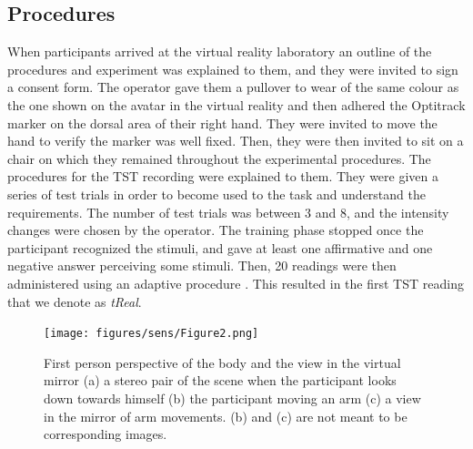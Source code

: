 \documentclass[
		twoside,openright,titlepage,numbers=noenddot,manychapters,
		headinclude,%
                footinclude=false,cleardoublepage=empty,
                BCOR=5mm,
		fontsize=11pt, %
                 enabledeprecatedfontcommands]{scrreprt}
\begin{document}
\subsection{Procedures}
When participants arrived at the virtual reality laboratory an outline of the procedures and experiment was explained to them, and they were invited to sign a consent form. The operator gave them a pullover to wear of the same colour as the one shown on the avatar in the virtual reality and then adhered the Optitrack marker on the dorsal area of their right hand. They were invited to move the hand to verify the marker was well fixed. Then, they were then invited to sit on a chair on which they remained throughout the experimental procedures. 
The procedures for the TST recording were explained to them. They were given a series of test trials in order to become used to the task and understand the requirements. The number of test trials was between 3 and 8, and the intensity changes were chosen by the operator. The training phase stopped once the participant recognized the stimuli, and gave at least one affirmative and one negative answer perceiving some stimuli. Then, 20 readings were then administered using an adaptive procedure \cite[]{Dyck1993a}. This resulted in the first TST reading that we denote as \emph{tReal}.



\begin{figure}[tb]

\begin{center}

\texttt{[image: figures/sens/Figure2.png]}
\caption{First person perspective of the body and the view in the virtual mirror (a) a stereo pair of the scene when the participant looks down towards himself (b) the participant moving an arm (c) a view in the mirror of arm movements. (b) and (c) are not meant to be corresponding images.}
\label{sens2}

\end{center}

\end{figure} 
\end{document}

